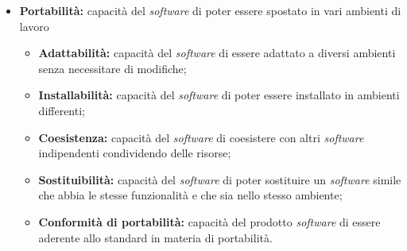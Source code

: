\begin{itemize}
	\item \textbf{Portabilità:} capacità del \textit{software} di poter essere 
	spostato in vari ambienti di lavoro
	\begin{itemize}
		\item \textbf{Adattabilità:} capacità del \textit{software} di essere 
		adattato a diversi ambienti senza necessitare di modifiche;
		\item \textbf{Installabilità:} capacità del \textit{software} di poter 
		essere installato in ambienti differenti;
		\item \textbf{Coesistenza:} capacità del \textit{software} di 
		coesistere con altri \textit{software} indipendenti condividendo delle 
		risorse;
		\item \textbf{Sostituibilità:} capacità del \textit{software} di poter 
		sostituire un \textit{software} simile che abbia le stesse funzionalità 
		e che sia nello stesso ambiente;
		\item \textbf{Conformità di portabilità:} capacità del prodotto 
		\textit{software} di essere aderente allo standard in materia di 
		portabilità.
	\end{itemize}
	
\end{itemize}
\newpage